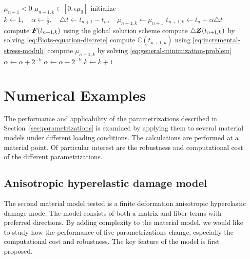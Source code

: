 \documentclass[12pt]{article}
\newcommand{\mbb}[1]{\mathbb{#1}}
\numberwithin{equation}{section}
\begin{document}
\begin{algorithm}
  \caption{$\text{AdaptiveStep}(\mu_0, \mu_{n+1}, t_{n+1}, \epsilon)$}
  \begin{algorithmic}
    \REQUIRE $\mu_{n+1} < 0$
    \ENSURE $\mu_{n+1,k} \in [0, \epsilon \mu_0]$
    \STATE initialize
    $k \leftarrow 1,
    \quad
    \alpha \leftarrow \frac{1}{2},
    \quad
    \triangle t \leftarrow t_{n+1} - t_n,
    \quad
    \mu_{n+1,k} \leftarrow \mu_{n+1}$
    \STATE $t_{n+1,k} \leftarrow t_n + \alpha \triangle t$
    \STATE compute ${\boldsymbol{F}}(t_{n+1,k})$ using the global solution scheme
    \STATE compute $\triangle {\boldsymbol{Z}}(t_{n+1,k})$
    by solving \eqref{eq:Biots-equation-discrete}
    \STATE compute $\mbb{C}(t_{n+1,k})$
    using \eqref{eq:incremental-stress-moduli}
    \STATE compute $\mu_{n+1,k}$
    by solving \eqref{eq:general-minimization-problem}
    \STATE $\alpha \leftarrow \alpha + 2^{-k}$
    \ELSE
    \STATE $\alpha \leftarrow \alpha - 2^{-k}$
    \ENDIF
    \STATE $k \leftarrow k+1$
    \ENDWHILE
  \end{algorithmic}
  \label{alg:adaptive-step}
\end{algorithm}

\section{Numerical Examples}
\label{sec:numerical-examples}

The performance and applicability of the parametrizations described in
Section~\ref{sec:parametrizations} is examined by applying them to
several material models under different loading conditions. The
calculations are performed at a material point. Of particular interest
are the robustness and computational cost of the different
parametrizations.

\subsection{Anisotropic hyperelastic damage model}\label{subsec:anisotropic}
The second material model tested is a finite deformation anisotropic
hyperelastic damage mode. The model consists of both a matrix and
fiber terms with preferred directions. By adding complexity to the
material model, we would like to study how the performance of five
parametrizations change, especially the computational cost and
robustness. The key feature of the model is first proposed.
\end{document}
